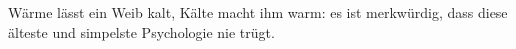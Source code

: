 Wärme lässt ein Weib kalt, Kälte macht ihm warm: es ist merkwürdig, dass diese älteste und simpelste Psychologie nie trügt.
\par

